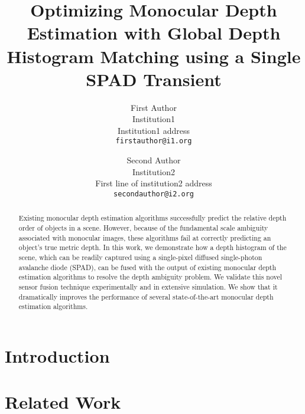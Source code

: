 \documentclass[10pt,twocolumn,letterpaper]{article}
\begin{document}
\title{Optimizing Monocular Depth Estimation with Global Depth Histogram
  Matching using a Single SPAD Transient}

\author{First Author\\
Institution1\\
Institution1 address\\
{\tt\small firstauthor@i1.org}
\and
Second Author\\
Institution2\\
First line of institution2 address\\
{\tt\small secondauthor@i2.org}
}

\maketitle

\begin{abstract}
Existing monocular depth estimation algorithms successfully predict the relative depth {order} of objects in a scene.
However, because of the fundamental scale ambiguity associated with monocular images, these algorithms fail at correctly predicting an object's true metric depth. 
In this work, we demonstrate how a depth histogram of the scene, which can be readily captured using a single-pixel diffused single-photon avalanche diode (SPAD), can be fused with the output of existing monocular depth estimation algorithms to resolve the depth ambiguity problem. 
We validate this novel sensor fusion technique experimentally and in extensive simulation. We show that it dramatically improves the performance of several state-of-the-art monocular depth estimation algorithms.
\end{abstract}


\section{Introduction}
\label{sec:intro}


\section{Related Work}
\label{sec:related}

\end{document}
